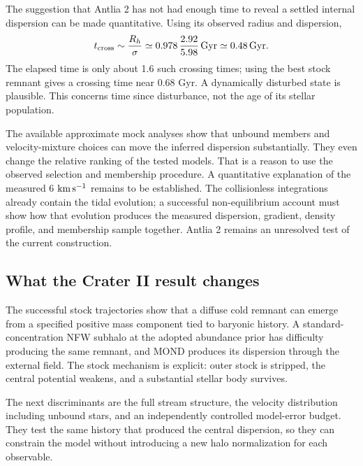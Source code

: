 The suggestion that Antlia 2 has not had enough time to reveal a settled
internal dispersion can be made quantitative. Using its observed radius
and dispersion,
\begin{equation}
t_{\rm cross}\sim\frac{R_h}{\sigma}
\simeq0.978\,\frac{2.92}{5.98}\,\mathrm{Gyr}
\simeq0.48\,\mathrm{Gyr}.
\end{equation}
The elapsed time is only about 1.6 such crossing times; using the best
stock remnant gives a crossing time near 0.68 Gyr. A dynamically disturbed
state is plausible. This concerns time since disturbance, not the age
of its stellar population.

The available approximate mock analyses show that unbound members and
velocity-mixture choices can move the inferred dispersion substantially.
They even change the relative ranking of the tested models. That is a
reason to use the observed selection and membership procedure. A
quantitative explanation of the measured 6 $\mathrm{km\,s^{-1}}$ remains to be established.
The collisionless integrations already contain the tidal evolution;
a successful non-equilibrium account must show how that evolution produces
the measured dispersion, gradient, density profile, and membership sample
together. Antlia 2 remains an unresolved test of the current construction.

\subsection{What the Crater II result changes}

The successful stock trajectories show that a diffuse cold remnant can
emerge from a specified positive mass component tied to baryonic history.
A standard-concentration NFW subhalo at the adopted abundance prior has
difficulty producing the same remnant, and MOND produces its dispersion
through the external field. The stock mechanism is explicit: outer stock
is stripped, the central potential weakens, and a substantial stellar
body survives.

The next discriminants are the full stream structure, the velocity
distribution including unbound stars, and an independently controlled
model-error budget. They test the same history that produced the central
dispersion, so they can constrain the model without introducing a new
halo normalization for each observable.
